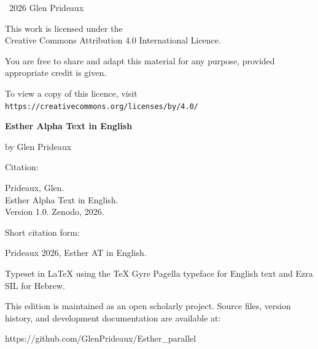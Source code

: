 \clearpage
\thispagestyle{empty}
\vspace*{\fill}

\small
\textcopyright\ 2026 Glen Prideaux

\vspace{1em}

This work is licensed under the\\
Creative Commons Attribution 4.0 International Licence.

\vspace{1em}

You are free to share and adapt this material for any purpose,
provided appropriate credit is given.

\vspace{1em}

To view a copy of this licence, visit\\
\texttt{https://creativecommons.org/licenses/by/4.0/}

\vspace{2em}

\textbf{Esther Alpha Text in English}

\vspace{1em}

by Glen Prideaux

\vspace{2em}
{
\setlength{\parindent}{1cm}%
\noindent Citation:\par
\indent Prideaux, Glen.\\
\indent Esther Alpha Text in English.\\
\indent Version 1.0. Zenodo, 2026.\\
\indent 

\noindent Short citation form:\par
\indent Prideaux 2026, Esther AT in English.
}

\vspace{2em}

Typeset in \LaTeX{} using the \TeX{} Gyre Pagella typeface for English
text and Ezra SIL for Hebrew.

This edition is maintained as an open scholarly project.
Source files, version history, and development documentation are available at:

https://github.com/GlenPrideaux/Esther\_parallel


